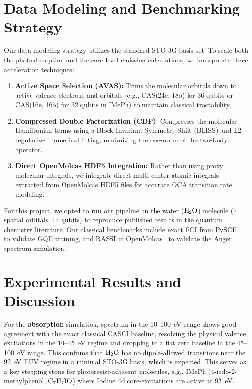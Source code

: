 \documentclass[11pt]{article}
\begin{document}
\section{Data Modeling and Benchmarking Strategy}
Our data modeling strategy utilizes the standard STO-3G basis set. To scale both the photoabsorption and the core-level emission calculations, we incorporate three acceleration techniques:
\begin{enumerate}[leftmargin=*,noitemsep,topsep=0pt]
  \item \textbf{Active Space Selection (AVAS):} Trims the molecular orbitals down to active valence electrons and orbitals (e.g., CAS(24e, 18o) for 36 qubits or CAS(16e, 16o) for 32 qubits in IMePh) to maintain classical tractability.
  \item \textbf{Compressed Double Factorization (CDF):} Compresses the molecular Hamiltonian terms using a Block-Invariant Symmetry Shift (BLISS) and L2-regularized numerical fitting, minimizing the one-norm of the two-body operator.
  \item \textbf{Direct OpenMolcas HDF5 Integration:} Rather than using proxy molecular integrals, we integrate direct multi-center atomic integrals extracted from OpenMolcas HDF5 files for accurate OCA transition rate modeling.
\end{enumerate}
For this project, we opted to run our pipeline on the water (${\rm H_2O}$) molecule (7 spatial orbitals, 14 qubits) to reproduce published results in the quantum chemistry literature. Our classical benchmarks include exact FCI from PySCF~\cite{pyscf2020} to validate GQE training, and RASSI in OpenMolcas~\cite{openmolcas2020} to validate the Auger spectrum simulation.

\section{Experimental Results and Discussion}
For the \textbf{absorption} simulation, spectrum in the 10--100~eV range shows good agreement with the exact classical CASCI baseline, resolving the physical valence excitations in the 10--45~eV regime and dropping to a flat zero baseline in the 45--100~eV range. This confirms that ${\rm H_2O}$ has no dipole-allowed transitions near the 92~eV EUV regime in a minimal STO-3G basis, which is expected. This serves as a key stepping stone for photoresist-adjacent molecules, e.g., IMePh (4-iodo-2-methylphenol, $\rm C_7H_7IO$) where Iodine 4d core-excitations are active at 92~eV.
\end{document}
